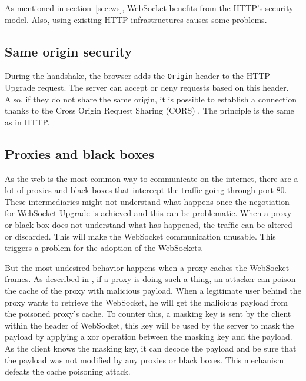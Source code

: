 \documentclass[10pt,journal,compsoc]{IEEEtran}
\newcommand{\ttt}[1]{\texttt{#1}}
\newcommand{\ws}{WebSocket}
\begin{document}
As mentioned in section~\ref{sec:ws}, \ws{} benefits from the HTTP's security model. Also, using existing HTTP infrastructures causes some problems. %

\subsection{Same origin security}

During the handshake, the browser adds the \ttt{Origin} header to the HTTP Upgrade request.
The server can accept or deny requests based on this header. %
Also, if they do not share the same origin, it is possible to establish a connection thanks to the Cross Origin Request Sharing (CORS) \cite{talkingtoyourself}. %
The principle is the same as in HTTP.

\subsection{Proxies and black boxes}
\label{sec:key}
As the web is the most common way to communicate on the internet, there are a lot of proxies and black boxes that intercept the traffic going through port 80. %
These intermediaries might not understand what happens once the negotiation for \ws{} Upgrade is achieved and this can be problematic. %
When a proxy or black box does not understand what has happened, the traffic can be altered or discarded. %
This will make the \ws{} communication unusable.
This triggers a problem for the adoption of the \ws s.  %

But the most undesired behavior happens when a proxy caches the \ws{} frames.
As described in \cite{talkingtoyourself}, if a proxy is doing such a thing, an attacker can poison the cache of the proxy with malicious payload. %
When a legitimate user behind the proxy wants to retrieve the \ws{}, he will get the malicious payload from the poisoned proxy's cache.
To counter this, a masking key is sent by the client within the header of \ws{}, this key will be used by the server to mask the payload by applying a xor operation between the masking key and the payload.
As the client knows the masking key, it can decode the payload and be sure that the payload was not modified by any proxies or black boxes. 
This mechanism defeats the cache poisoning attack.
\end{document}
